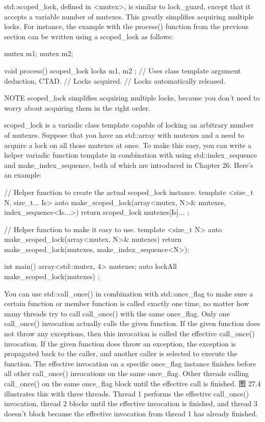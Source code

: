 
std::scoped\_lock, defined in <mutex>, is similar to lock\_guard, except that it accepts a variable number of mutexes. This greatly simplifies acquiring multiple locks. For instance, the example with the process() function from the previous section can be written using a scoped\_lock as follows:

\begin{cpp}
mutex m1;
mutex m2;

void process()
{
    scoped_lock locks { m1, m2 }; // Uses class template argument deduction, CTAD.
    // Locks acquired.
} // Locks automatically released.
\end{cpp}

\begin{myNotic}{NOTE}
scoped\_lock simplifies acquiring multiple locks, because you don’t need to worry about acquiring them in the right order.
\end{myNotic}

scoped\_lock is a variadic class template capable of locking an arbitrary number of mutexes. Suppose that you have an std::array with mutexes and a need to acquire a lock on all those mutexes at once. To make this easy, you can write a helper variadic function template in combination with using std::index\_sequence and make\_index\_sequence, both of which are introduced in Chapter 26. Here’s an example:

\begin{cpp}
// Helper function to create the actual scoped_lock instance.
template <size_t N, size_t... Is>
auto make_scoped_lock(array<mutex, N>& mutexes, index_sequence<Is...>)
{
    return scoped_lock { mutexes[Is]... };
}

// Helper function to make it easy to use.
template <size_t N>
auto make_scoped_lock(array<mutex, N>& mutexes)
{
    return make_scoped_lock(mutexes, make_index_sequence<N>{});
}

int main()
{
    array<std::mutex, 4> mutexes;
    auto lockAll { make_scoped_lock(mutexes) };
}
\end{cpp}


You can use std::call\_once() in combination with std::once\_flag to make sure a certain function or member function is called exactly one time, no matter how many threads try to call call\_once() with the same once\_flag. Only one call\_once() invocation actually calls the given function. If the given function does not throw any exceptions, then this invocation is called the effective call\_once() invocation. If the given function does throw an exception, the exception is propagated back to the caller, and another caller is selected to execute the function. The effective invocation on a specific once\_flag instance finishes before all other call\_once() invocations on the same once\_flag. Other threads calling call\_once() on the same once\_flag block until the effective call is finished. 图 27.4 illustrates this with three threads. Thread 1 performs the effective call\_once() invocation, thread 2 blocks until the effective invocation is finished, and thread 3 doesn’t block because the effective invocation from thread 1 has already finished.

